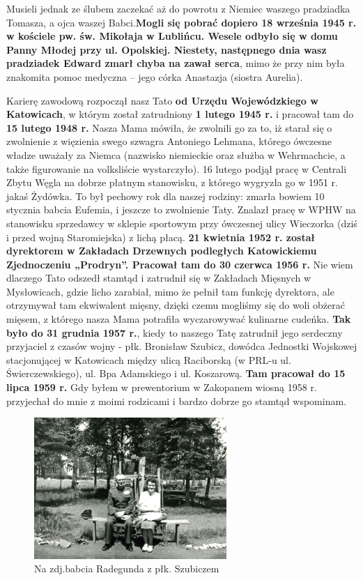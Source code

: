Musieli jednak ze ślubem zaczekać aż do powrotu z Niemiec waszego pradziadka Tomasza, a ojca waszej Babci.\textbf{Mogli się pobrać dopiero 18 września 1945 r. w kościele pw. św. Mikołaja w Lublińcu. Wesele odbyło się w domu Panny Młodej przy ul. Opolskiej. Niestety, następnego dnia wasz pradziadek Edward zmarł chyba na zawał serca}, mimo że przy nim była znakomita pomoc medyczna – jego córka Anastazja (siostra Aurelia).

Karierę zawodową rozpoczął nasz Tato \textbf{od Urzędu Wojewódzkiego w Katowicach}, w którym został zatrudniony \textbf{1 lutego 1945 r.} i pracował tam do \textbf{15 lutego 1948 r.} Nasza Mama mówiła, że zwolnili go za to, iż starał się o zwolnienie z więzienia swego szwagra Antoniego Lehmana, którego ówczesne władze uważały za Niemca (nazwisko niemieckie oraz służba w Wehrmachcie, a także figurowanie na volksliście wystarczyło). 16 lutego podjął pracę w Centrali Zbytu Węgla na dobrze płatnym stanowisku, z którego wygryzła go w 1951 r. jakaś Żydówka. To był pechowy rok dla naszej rodziny: zmarła bowiem 10 stycznia babcia Eufemia, i jeszcze to zwolnienie Taty. Znalazł pracę w WPHW na stanowisku sprzedawcy w sklepie sportowym przy ówczesnej ulicy Wieczorka (dziś i przed wojną Staromiejska) z lichą płacą. \textbf{21 kwietnia 1952 r. został dyrektorem w Zakładach Drzewnych podległych Katowickiemu Zjednoczeniu „Prodryn”. Pracował tam do 30 czerwca 1956 r.} Nie wiem dlaczego Tato odszedł stamtąd i zatrudnił się w Zakładach Mięsnych w Mysłowicach, gdzie licho zarabiał, mimo że pełnił tam funkcję dyrektora, ale otrzymywał tam ekwiwalent mięsny, dzięki czemu mogliśmy się do woli obżerać mięsem, z którego nasza Mama potrafiła wyczarowywać kulinarne cudeńka. \textbf{Tak było do 31 grudnia 1957 r.}, kiedy to naszego Tatę zatrudnił jego serdeczny przyjaciel z czasów wojny - płk. Bronisław Szubicz, dowódca Jednostki Wojskowej stacjonującej w Katowicach między ulicą Raciborską (w PRL-u ul. Świerczewskiego), ul. Bpa Adamskiego i ul. Koszarową. \textbf{Tam pracował do 15 lipca 1959 r.} Gdy byłem w prewentorium w Zakopanem wiosną 1958 r. przyjechał do mnie z moimi rodzicami i bardzo dobrze go stamtąd wspominam.
\begin{figure}[!h]
\begin{center}
\includegraphics[width=0.65\textwidth]{photo/radegunda_swierczynska_plk_szubicz.jpg}
\caption{Na zdj.babcia Radegunda z płk. Szubiczem}
\end{center}
\end{figure}


